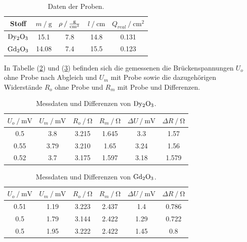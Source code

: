 \begin{table}
    \centering
    \begin{tabular}{c c c c c}
        \toprule
        {Stoff} & {$m \mathbin{/} \si{\gram}$} & {$\rho \mathbin{/} \si[per-mode=fraction]{\gram\per\cubic\centi\meter}$} & {$l \mathbin{/} \si{\centi\meter}$} & {$Q_{real} \mathbin{/} \si{\centi\meter\squared}$} \\
    \midrule
    $\ce{Dy2O3}$ & 15.1  & 7.8 & 14.8 & 0.131 \\
    $\ce{Gd2O3}$ & 14.08 & 7.4 & 15.5 & 0.123 \\
    \bottomrule
\end{tabular}
\caption{Daten der Proben.}
\label{tab:proben}
\end{table}

\noindent
In Tabelle (\ref{tab:exp1}) und (\ref{tab:exp2}) befinden sich die gemessenen die Brückenspannungen $U_o$ ohne Probe nach Abgleich und $U_m$ mit Probe sowie die dazugehörigen Widerstände
$R_o$ ohne Probe und $R_m$ mit Probe und Differenzen. 

\begin{table}
    \centering
    \begin{tabular}{c c c c c c}
        \toprule
        {$U_o \mathbin{/} \si{\milli\volt}$} & {$U_m \mathbin{/} \si{\milli\volt}$} & {$R_o \mathbin{/} \si{\ohm}$} & {$R_m \mathbin{/} \si{\ohm}$} & {$\Delta U \mathbin{/} \si{\milli\volt}$} & {$\Delta R \mathbin{/} \si{\ohm}$} \\
    \midrule
    0.5     &   3.8   &     3.215     &     1.645    &   3.3   &  1.57  \\
    0.55    &   3.79  &     3.210     &     1.65     &   3.24  &  1.56  \\ 
    0.52    &   3.7   &     3.175     &     1.597    &   3.18  &  1.579 \\
    \bottomrule
\end{tabular}
\caption{Messdaten und Differenzen von $\ce{Dy2O3}$.}
\label{tab:exp1}
\end{table}

\begin{table}
    \centering
    \begin{tabular}{c c c c c c}
        \toprule
        {$U_o \mathbin{/} \si{\milli\volt}$} & {$U_m \mathbin{/} \si{\milli\volt}$} & {$R_o \mathbin{/} \si{\ohm}$} & {$R_m \mathbin{/} \si{\ohm}$} & {$\Delta U \mathbin{/} \si{\milli\volt}$} & {$\Delta R \mathbin{/} \si{\ohm}$} \\
    \midrule
    0.51    &   1.19   &     3.223     &     2.437    &   1.4   &  0.786  \\
    0.5     &   1.79   &     3.144     &     2.422    &   1.29  &  0.722  \\ 
    0.5     &   1.95   &     3.222     &     2.422    &   1.45  &  0.8    \\
    \bottomrule
\end{tabular}
\caption{Messdaten und Differenzen von $\ce{Gd2O3}$.}
\label{tab:exp2}
\end{table}

